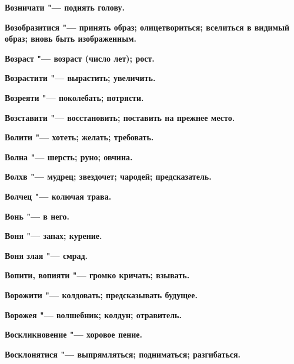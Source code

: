 \begin{multicols}{2}
\bfseries Возничати\normalfont{} "--- поднять голову. 




\bfseries Возобразитися\normalfont{} "--- принять образ; олицетвориться; вселиться в видимый образ; вновь быть изображенным. 




\bfseries Возраст\normalfont{} "--- возраст (число лет); рост. 




\bfseries Возрастити\normalfont{} "--- вырастить; увеличить. 




\bfseries Возреяти\normalfont{} "--- поколебать; потрясти. 




\bfseries Возставити\normalfont{} "--- восстановить; поставить на прежнее место. 




\bfseries Волити\normalfont{} "--- хотеть; желать; требовать. 




\bfseries Волна\normalfont{} "--- шерсть; руно; овчина. 




\bfseries Волхв\normalfont{} "--- мудрец; звездочет; чародей; предсказатель. 




\bfseries Волчец\normalfont{} "--- колючая трава. 




\bfseries Вонь\normalfont{} "--- в него. 




\bfseries Воня\normalfont{} "--- запах; курение. 




\bfseries Воня злая\normalfont{} "--- смрад. 




\bfseries Вопити, вопияти\normalfont{} "--- громко кричать; взывать. 




\bfseries Ворожити\normalfont{} "--- колдовать; предсказывать будущее. 




\bfseries Ворожея\normalfont{} "--- волшебник; колдун; отравитель. 




\bfseries Воскликновение\normalfont{} "--- хоровое пение. 




\bfseries Восклонятися\normalfont{} "--- выпрямляться; подниматься; разгибаться. 





\end{multicols}
